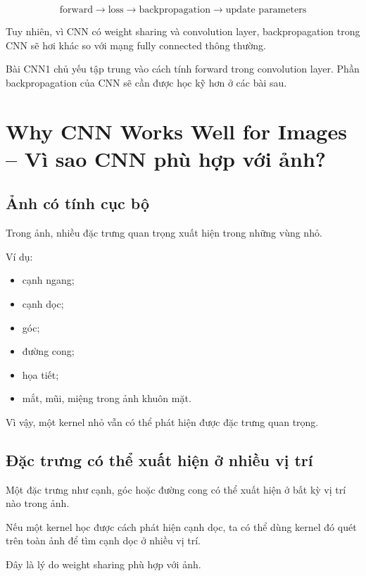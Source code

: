 \[
    \text{forward}
    \rightarrow
    \text{loss}
    \rightarrow
    \text{backpropagation}
    \rightarrow
    \text{update parameters}
\]

Tuy nhiên, vì CNN có weight sharing và convolution layer, backpropagation trong CNN sẽ hơi khác so với mạng fully connected thông thường.

\begin{luuy}
Bài CNN1 chủ yếu tập trung vào cách tính forward trong convolution layer. Phần backpropagation của CNN sẽ cần được học kỹ hơn ở các bài sau.
\end{luuy}

\section{Why CNN Works Well for Images -- Vì sao CNN phù hợp với ảnh?}

\subsection{Ảnh có tính cục bộ}

Trong ảnh, nhiều đặc trưng quan trọng xuất hiện trong những vùng nhỏ.

Ví dụ:

\begin{itemize}
    \item cạnh ngang;
    \item cạnh dọc;
    \item góc;
    \item đường cong;
    \item họa tiết;
    \item mắt, mũi, miệng trong ảnh khuôn mặt.
\end{itemize}

Vì vậy, một kernel nhỏ vẫn có thể phát hiện được đặc trưng quan trọng.

\subsection{Đặc trưng có thể xuất hiện ở nhiều vị trí}

Một đặc trưng như cạnh, góc hoặc đường cong có thể xuất hiện ở bất kỳ vị trí nào trong ảnh.

Nếu một kernel học được cách phát hiện cạnh dọc, ta có thể dùng kernel đó quét trên toàn ảnh để tìm cạnh dọc ở nhiều vị trí.

Đây là lý do weight sharing phù hợp với ảnh.

